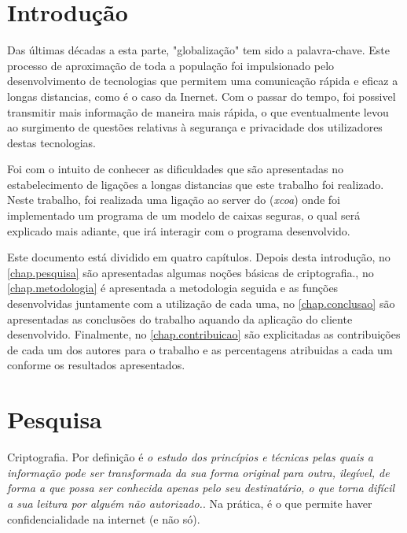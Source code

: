 \documentclass{report}
\begin{document}
\tableofcontents
\listoffigures    %


\clearpage
{}

\chapter{Introdução}
\label{chap.introducao}

Das últimas décadas a esta parte, "globalização" tem sido a palavra-chave.
Este processo de aproximação de toda a população foi impulsionado pelo desenvolvimento de tecnologias que permitem uma comunicação rápida e eficaz a longas distancias, como é o caso da Inernet. \br
Com o passar do tempo, foi possivel transmitir mais informação de maneira mais rápida, o que eventualmente levou ao surgimento de questões relativas à segurança e privacidade dos utilizadores destas tecnologias.

Foi com o intuito de conhecer as dificuldades que são apresentadas no estabelecimento de ligações a longas distancias que este trabalho foi realizado. Neste trabalho, foi realizada uma ligação ao server do (\textit{xcoa}) onde foi implementado um programa de um modelo de caixas seguras, o qual será explicado mais adiante, que irá interagir com o programa desenvolvido.

Este documento está dividido em quatro capítulos.
Depois desta introdução,
no \autoref{chap.pesquisa} são apresentadas algumas noções básicas de criptografia.,
no \autoref{chap.metodologia} é apresentada a metodologia seguida e as funções desenvolvidas juntamente com a utilização de cada uma,
no \autoref{chap.conclusao} são apresentadas
as conclusões do trabalho aquando da aplicação do cliente desenvolvido.
Finalmente, no \autoref{chap.contribuicao} são explicitadas as contribuições de cada um dos autores para o trabalho e as percentagens atribuidas a cada um conforme os resultados apresentados.


\chapter{Pesquisa}
\label{chap.pesquisa}

Criptografia.
Por definição é \textit{o estudo dos princípios e técnicas pelas quais a informação pode ser transformada da sua forma original para outra, ilegível, de forma a que possa ser conhecida apenas pelo seu destinatário, o que torna difícil a sua leitura por alguém não autorizado.}.
Na prática, é o que permite haver confidencialidade na internet (e não só).
\end{document}
